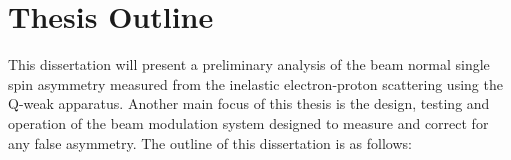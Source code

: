 

\section{Thesis Outline}%
\label{Thesis Outline}


This dissertation will present a preliminary analysis of the beam normal single spin asymmetry measured from the inelastic electron-proton scattering using the Q-weak apparatus. 
Another main focus of this thesis is the design, testing and operation of the beam modulation system designed to measure and correct for any false asymmetry.
The outline of this dissertation is as follows:


